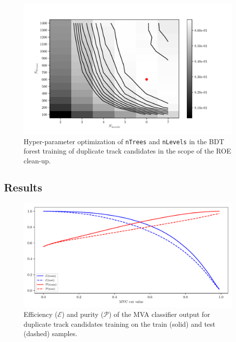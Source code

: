 \documentclass[headings=standardclasses,headings=big,oneside,a4paper,openany,12pt]{scrbook}
\begin{document}
\begin{figure}[H]
\centering
\captionsetup{width=0.8\linewidth}
\includegraphics[width=\linewidth]{fig/addendums/curl_hpo}
\caption{Hyper-parameter optimization of \texttt{nTrees} and \texttt{nLevels} in the BDT forest training of duplicate track candidates in the scope of the ROE clean-up.}
\end{figure}

\subsection*{Results}

\begin{figure}[H]
\centering
\captionsetup{width=0.8\linewidth}
\includegraphics[width=\linewidth]{fig/addendums/curl_effpur}
\caption{Efficiency ($\mathcal{E}$) and purity ($\mathcal{P}$) of the MVA classifier output for duplicate track candidates training on the train (solid) and test (dashed) samples.}
\end{figure}
\end{document}
